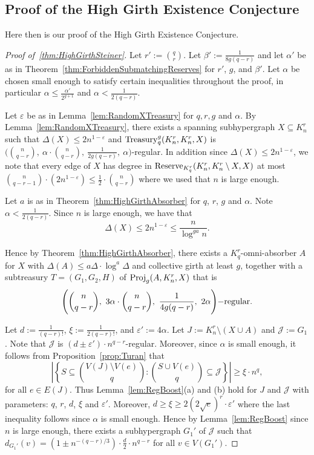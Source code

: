 \documentclass[11pt]{article}
\newcounter{i}
\theoremstyle{plain}
\renewcommand{\theclaim}{\thetheorem.\arabic{claim}}
\newenvironment{lateproof}[1]
 {%
  \renewcommand{\theclaim}{\ref{#1}.\arabic{claim}}%
  \begin{proof}[Proof of~\cref{#1}]%
 }
 {\end{proof}}
\theoremstyle{plain} %
\theoremstyle{definition}
\begin{document}
\subsection{Proof of the High Girth Existence Conjecture}


Here then is our proof of the High Girth Existence Conjecture.

\begin{lateproof}{thm:HighGirthSteiner}
Let $r':= \binom{q}{r}$. Let $\beta' := \frac{1}{8g(q-r)}$ and let $\alpha'$ be as in Theorem~\ref{thm:ForbiddenSubmatchingReserves} for $r'$, $g$, and $\beta'$. Let $\alpha$ be chosen small enough to satisfy certain inequalities throughout the proof, in particular $\alpha\le  \frac{\alpha'}{2^{g+1}}$ and $\alpha < \frac{1}{2(q-r)}$. 

Let $\varepsilon$ be as in Lemma~\ref{lem:RandomXTreasury} for $q,r,g$ and $\alpha$. By Lemma~\ref{lem:RandomXTreasury}, there exists a spanning subhypergraph  $X\subseteq K_n^r$ such that $\Delta(X)\le 2n^{1-\varepsilon}$ and ${\rm Treasury}^g_q(K_n^r,K_n^r,X)$ is $\bigg(\binom{n}{q-r},~\alpha\cdot \binom{n}{q-r},~\frac{1}{2g(q-r)},~\alpha\bigg)$-regular. In addition since $\Delta(X) \le 2n^{1-\varepsilon}$, we note that every edge of $X$ has degree in ${\rm Reserve}_{K_q^r}(K_n^r,K_n^r\setminus X, X)$ at most $\binom{n}{q-r-1}\cdot (2n^{1-\varepsilon}) \le \frac{1}{2}\cdot \binom{n}{q-r}$ where we used that $n$ is large enough. 


Let $a$ is as in Theorem~\ref{thm:HighGirthAbsorber} for $q$, $r$, $g$ and $\alpha$. Note $\alpha < \frac{1}{2(q-r)}$. Since $n$ is large enough, we have that 
$$\Delta(X) \le 2n^{1-\varepsilon} \le \frac{n}{\log^{ga} n}.$$ 

Hence by Theorem~\ref{thm:HighGirthAbsorber}, there exists a $K_q^r$-omni-absorber $A$ for $X$ with $\Delta(A)\le a\Delta\cdot \log^{a} \Delta$ and collective girth at least $g$, together with a subtreasury $T=(G_1,G_2,H)$ of ${\rm Proj}_g(A, K_n^r, X)$ that is 
$$\Bigg(\binom{n}{q-r},~3\alpha \cdot \binom{n}{q-r},~\frac{1}{4g(q-r)},~2\alpha\Bigg){\rm - regular}.$$ 


Let $d:=\frac{1}{(q-r)!}$, $\xi:=\frac{1}{2(q-r)!}$, and $\varepsilon' :=4\alpha$. Let $J:=K_n^r\setminus (X\cup A)$ and $\mathcal{J}:=G_1$. Note that $\mathcal{J}$ is $(d\pm \varepsilon')\cdot n^{q-r}$-regular. Moreover, since $\alpha$ is small enough, it follows from Proposition~\ref{prop:Turan} that 
$$\left|\left\{ S\subseteq \binom{V(J)\setminus V(e)}{q}: \binom{S\cup V(e)}{q}\subseteq \mathcal{J} \right\}\right| \ge \xi\cdot n^q,$$
for all $e\in E(J)$. Thus Lemma~\ref{lem:RegBoost}(a) and (b) hold for $J$ and $\mathcal{J}$ with parameters: $q$, $r$, $d$, $\xi$ and $\varepsilon'$. Moreover, $d\ge \xi \ge 2(2\sqrt{e})^r\cdot \varepsilon'$ where the last inequality follows since $\alpha$ is small enough. Hence by Lemma~\ref{lem:RegBoost} since $n$ is large enough, there exists a subhypergraph $G_1'$ of $\mathcal{J}$ such that $d_{G_1'}(v) = \left(1 \pm n^{-(q-r)/3}\right) \cdot \frac{d}{2} \cdot n^{q-r}$ for all $v\in V(G_1')$.


\end{lateproof}
\end{document}
